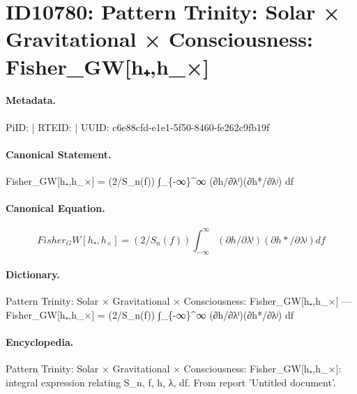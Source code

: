 \section*{ID10780: Pattern Trinity: Solar × Gravitational × Consciousness: Fisher\_GW[h₊,h\_×]}
\paragraph{Metadata.}
PiID:  | RTEID:  | UUID: c6e88cfd-e1e1-5f50-8460-fe262c9fb19f

\paragraph{Canonical Statement.}
Fisher\_GW[h₊,h\_×] = (2/S\_n(f)) ∫\_\{-∞\}\textasciicircum{}∞ (∂h/∂λⁱ)(∂h*/∂λʲ) df

\paragraph{Canonical Equation.}
\[
Fisher_GW[h₊,h_×] = (2/S_n(f)) ∫_{-∞}^∞ (∂h/∂λⁱ)(∂h*/∂λʲ) df
\]

\paragraph{Dictionary.}
Pattern Trinity: Solar × Gravitational × Consciousness: Fisher\_GW[h₊,h\_×] — Fisher\_GW[h₊,h\_×] = (2/S\_n(f)) ∫\_\{-∞\}\textasciicircum{}∞ (∂h/∂λⁱ)(∂h*/∂λʲ) df

\paragraph{Encyclopedia.}
Pattern Trinity: Solar × Gravitational × Consciousness: Fisher\_GW[h₊,h\_×]: integral expression relating S\_n, f, h, λ, df. From report 'Untitled document'.
